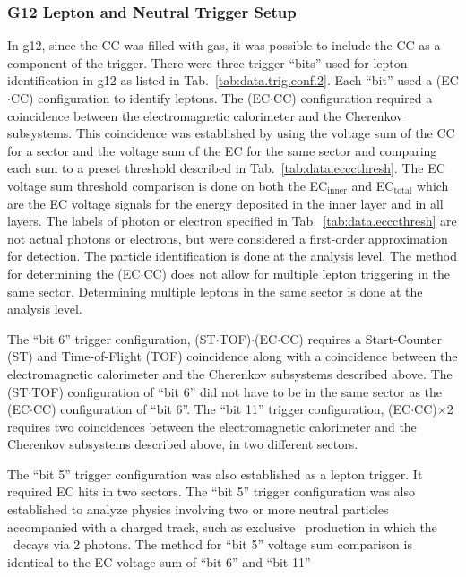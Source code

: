 	\subsubsection{G12 Lepton and Neutral Trigger Setup}\label{sec.data.trig.lepton}
In g12, since the CC was filled with gas, it was possible to include the CC as a component of the trigger. 
There were three trigger ``bits'' used for lepton identification in g12 as listed in Tab.~\ref{tab:data.trig.conf.2}. Each ``bit'' used a (EC$\cdot$CC) configuration to identify leptons. The (EC$\cdot$CC) configuration required a coincidence between the electromagnetic calorimeter and the Cherenkov subsystems. This coincidence was established by using the voltage sum of the CC for a sector and the voltage sum of the EC for the same sector and comparing each sum to a preset threshold described in Tab.~\ref{tab:data.ecccthresh}. The EC voltage sum threshold comparison is done on both the EC$_\mathrm{inner}$ and EC$_{\mathrm{total}}$ which are the EC voltage signals for the energy deposited in the inner layer and in all layers. The labels of photon or electron specified in Tab.~\ref{tab:data.ecccthresh} are not actual photons or electrons, but were considered a first-order approximation for detection. The particle identification is done at the analysis level. The method for determining the (EC$\cdot$CC) does not allow for multiple lepton triggering in the same sector. Determining multiple leptons in the same sector is done at the analysis level. 

The ``bit 6'' trigger configuration, (ST$\cdot$TOF)$\cdot$(EC$\cdot$CC) requires a Start-Counter (ST) and Time-of-Flight (TOF) coincidence along with a coincidence between the electromagnetic calorimeter and the Cherenkov subsystems described above. The (ST$\cdot$TOF) configuration of ``bit 6'' did not have to be in the same sector as the (EC$\cdot$CC) configuration of ``bit 6''. The ``bit 11'' trigger configuration, (EC$\cdot$CC)$\times$2 requires two coincidences between the electromagnetic calorimeter and the Cherenkov subsystems described above, in two different sectors. 

The ``bit 5'' trigger configuration was also established as a lepton trigger. It required EC hits in two sectors. The ``bit 5'' trigger configuration was also established to analyze physics involving two or more neutral particles accompanied with a charged track, such as exclusive \pizT \ production in which the \pizT \ decays via 2 photons. The method for ``bit 5'' voltage sum comparison is identical to the EC voltage sum of ``bit 6'' and ``bit 11''

